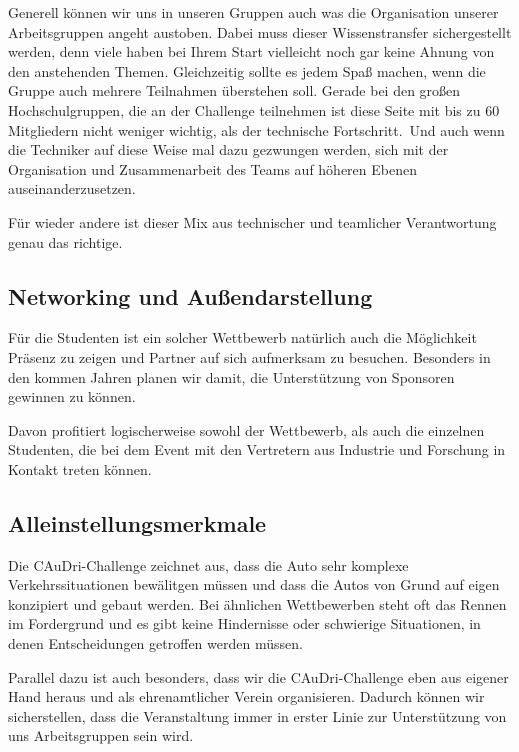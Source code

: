 Generell können wir uns in unseren Gruppen auch was die Organisation unserer
Arbeitsgruppen angeht austoben. Dabei muss dieser Wissenstransfer sichergestellt werden,
denn viele haben bei Ihrem Start vielleicht noch gar keine
Ahnung von den anstehenden Themen. Gleichzeitig sollte es jedem Spaß machen,
wenn die Gruppe auch mehrere Teilnahmen überstehen soll. 
Gerade bei den großen Hochschulgruppen, die an der Challenge teilnehmen ist diese
Seite mit bis zu 60 Mitgliedern nicht weniger wichtig, als der technische Fortschritt.\
Und auch wenn die Techniker auf diese Weise mal dazu gezwungen werden, sich
mit der Organisation und Zusammenarbeit des Teams auf höheren Ebenen auseinanderzusetzen.

Für wieder andere ist dieser Mix aus technischer und teamlicher Verantwortung
genau das richtige.

\subsection{Networking und Außendarstellung}
Für die Studenten ist ein solcher Wettbewerb natürlich auch die Möglichkeit Präsenz zu
zeigen und Partner auf sich aufmerksam zu besuchen. 
Besonders in den kommen Jahren planen wir damit, die Unterstützung von Sponsoren 
gewinnen zu können. 

Davon profitiert logischerweise sowohl der Wettbewerb, als auch die einzelnen Studenten,
die bei dem Event mit den Vertretern aus Industrie und Forschung in Kontakt treten können.

\subsection{Alleinstellungsmerkmale}
Die CAuDri-Challenge zeichnet aus, dass die Auto sehr komplexe Verkehrssituationen
bewälitgen müssen und dass die Autos von Grund auf eigen konzipiert und gebaut werden.
Bei ähnlichen Wettbewerben steht oft das Rennen im Fordergrund und es gibt keine Hindernisse
oder schwierige Situationen, in denen Entscheidungen getroffen werden müssen.

Parallel dazu ist auch besonders, dass wir die CAuDri-Challenge eben aus eigener
Hand heraus und als ehrenamtlicher Verein organisieren. Dadurch können wir sicherstellen,
dass die Veranstaltung immer in erster Linie zur Unterstützung von uns Arbeitsgruppen
sein wird.
